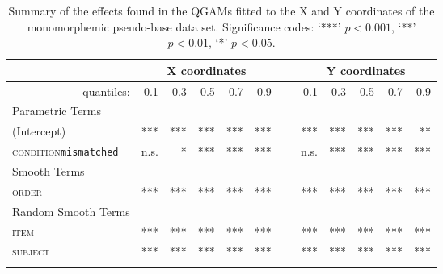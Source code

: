 \begin{table}\fontsize{9}{10}
\caption{Summary of the effects found in the QGAMs fitted to the X and Y coordinates of the monomorphemic pseudo-base data set. Significance codes: `***' $p < 0.001$, `**' $p < 0.01$, `*' $p < 0.05$.}
\label{tab:7.11}
\centering
\begin{tabular}{lrrrrrrrrrrr}
\lsptoprule
~                   & \multicolumn{5}{c}{X coordinates}       & \multicolumn{1}{c}{}                       & \multicolumn{5}{c}{Y coordinates}                               \\
\midrule
\multicolumn{1}{r}{quantiles:}          & 0.1        & 0.3        & 0.5        & 0.7        & 0.9 & ~        & 0.1        & 0.3        & 0.5        & 0.7        & 0.9         \\
\midrule
Parametric Terms    & \textbf{~} & \textbf{~} & \textbf{~} & \textbf{~} & \textbf{~} & \textbf{~} & \textbf{~} & \textbf{~} & \textbf{~} & \textbf{~}  \\
\midrule
(Intercept)         & ***        & ***        & ***        & ***        & *** & ~       & ***        & ***        & ***        & ***        & **          \\
\textsc{condition}\texttt{mismatched} & n.s.       & *          & ***        & ***        & ***   & ~     & n.s.       & ***        & ***        & ***        & ***         \\
\midrule
Smooth Terms        & \textbf{~} & \textbf{~} & \textbf{~} & \textbf{~} & \textbf{~} & \textbf{~} & \textbf{~} & \textbf{~} & \textbf{~} & \textbf{~}  \\
\midrule
\textsc{order}               & ***        & ***        & ***        & ***        & ***  & ~      & ***        & ***        & ***        & ***        & ***         \\
\midrule
Random Smooth Terms & \textbf{~} & \textbf{~} & \textbf{~} & \textbf{~} & \textbf{~} & \textbf{~} & \textbf{~} & \textbf{~} & \textbf{~} & \textbf{~}  \\
\midrule
\textsc{item}                & ***        & ***        & ***        & ***        & ***   & ~     & ***        & ***        & ***        & ***        & ***         \\
\textsc{subject}             & ***        & ***        & ***        & ***        & ***   & ~     & ***        & ***        & ***        & ***        & ***        \\
\lspbottomrule
\end{tabular}
\end{table}

